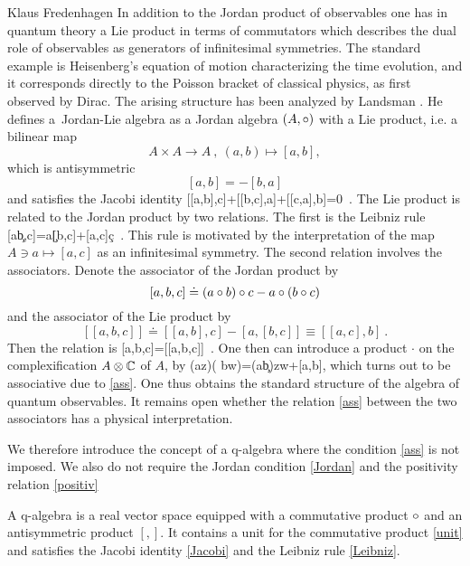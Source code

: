 \begin{artengenv}{Klaus Fredenhagen}
In addition to the Jordan product of observables one has in quantum theory a Lie product in terms of commutators which describes the dual role of observables as generators of infinitesimal symmetries. The standard example is Heisenberg's equation of motion
characterizing the time evolution, and it corresponds directly to the Poisson bracket of classical physics, as first observed by Dirac. The arising structure has been analyzed by Landsman \parencite*{Landsman}. He defines a~Jordan-Lie algebra as a Jordan algebra $(A,\circ)$ with a Lie product, i.e. a bilinear map   
\[
A\times A\to A\ ,\ (a,b)\mapsto [a,b],
\]
which is antisymmetric
\[ [a,b]=-[b,a]\]
and satisfies the Jacobi identity
\be\label{Jacobi}[[a,b],c]+[[b,c],a]+[[c,a],b]=0\ .\ee
The Lie product is related to the Jordan product by two relations. The first is the Leibniz rule
\be\label{Leibniz}[a\c b,c]=a\c[b,c]+[a,c]\c c\ .\ee
This rule is motivated by the interpretation of the map $A\ni a\mapsto[a,c]$ as an infinitesimal symmetry.
The second relation involves the associators. 
Denote the associator of the Jordan product by
\[[a,b,c]\doteq(a\circ b)\circ c-a\circ(b\circ c)\]
and the associator of the Lie product by
\[[[a,b,c]]\doteq[[a,b],c]-[a,[b,c]]\equiv[[a,c],b]\ .\]
Then the relation is
\be\label{ass}[a,b,c]=[[a,b,c]]\ .\ee
\newcommand{\ot}{\otimes}
One then can introduce a product $\cdot$ on the complexification $A\ot\CC$ of $A$, by
\be\label{complex} (a\ot z)\cdot( b\ot w)=(a\c b)\ot zw+[a,b]\ot{},\ee
which turns out to be associative due to \eqref{ass}. One thus obtains the standard structure of the algebra of quantum observables.
It remains open whether the relation \eqref{ass} between the two associators has a physical interpretation.

We therefore introduce the concept of a q-algebra where the condition \eqref{ass} is not imposed. We also do not require the Jordan condition \eqref{Jordan} and the positivity relation \eqref{positiv}
\begin{definition-fred}
A q-algebra is a real vector space equipped with a commutative product $\circ$ and an antisymmetric product $[,]$. It contains a unit for the commutative product \eqref{unit} and satisfies the Jacobi identity \eqref{Jacobi} and the Leibniz rule \eqref{Leibniz}.
\end{definition-fred}



\end{artengenv}
